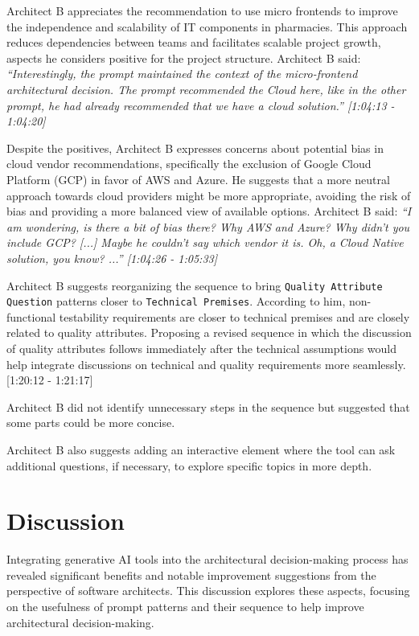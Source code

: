 Architect B appreciates the recommendation to use micro frontends to improve the independence and scalability of IT components in pharmacies. This approach reduces dependencies between teams and facilitates scalable project growth, aspects he considers positive for the project structure. Architect B said:\textit{ ``Interestingly, the prompt maintained the context of the micro-frontend architectural decision. The prompt recommended the Cloud here, like in the other prompt, he had already recommended that we have a cloud solution.'' [1:04:13 - 1:04:20]
}

Despite the positives, Architect B expresses concerns about potential bias in cloud vendor recommendations, specifically the exclusion of Google Cloud Platform (GCP) in favor of AWS and Azure. He suggests that a more neutral approach towards cloud providers might be more appropriate, avoiding the risk of bias and providing a more balanced view of available options. Architect B said: \textit{``I am wondering, is there a bit of bias there? Why AWS and Azure? Why didn't you include GCP? [...] Maybe he couldn't say which vendor it is. Oh, a Cloud Native solution, you know? ...'' [1:04:26 - 1:05:33]}


Architect B suggests reorganizing the sequence to bring \texttt{Quality Attribute Question} patterns closer to \texttt{Technical Premises}. According to him, non-functional testability requirements are closer to technical premises and are closely related to quality attributes. Proposing a revised sequence in which the discussion of quality attributes follows immediately after the technical assumptions would help integrate discussions on technical and quality requirements more seamlessly. [1:20:12 - 1:21:17]

Architect B did not identify unnecessary steps in the sequence but suggested that some parts could be more concise. 

Architect B also suggests adding an interactive element where the tool can ask additional questions, if necessary, to explore specific topics in more depth.

\section{Discussion}
Integrating generative AI tools into the architectural decision-making process has revealed significant benefits and notable improvement suggestions from the perspective of software architects. This discussion explores these aspects, focusing on the usefulness of prompt patterns and their sequence to help improve architectural decision-making.


